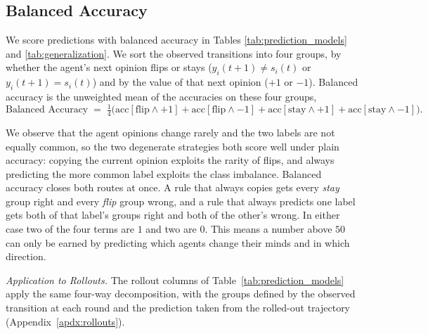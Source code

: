 \subsection{Balanced Accuracy}\label{apdx:metric}

We score predictions with balanced accuracy in Tables \ref{tab:prediction_models} and \ref{tab:generalization}. We sort the observed transitions into four groups, by whether the agent's next opinion flips or stays
($y_i(t{+}1) \neq s_i(t)$ or $y_i(t{+}1) = s_i(t)$) and by the value of that next opinion
($+1$ or $-1$). Balanced accuracy is the unweighted mean of the accuracies on these four groups,
\[
\text{Balanced Accuracy} \;=\; \tfrac{1}{4}\Big(
\mathrm{acc}[\text{flip} \wedge {+}1] +
\mathrm{acc}[\text{flip} \wedge {-}1] +
\mathrm{acc}[\text{stay} \wedge {+}1] +
\mathrm{acc}[\text{stay} \wedge {-}1]
\Big).
\]

We observe that the agent opinions change rarely and the two labels are not equally
common, so the two degenerate strategies both score well under plain accuracy: copying the
current opinion exploits the rarity of flips, and always predicting the more common label
exploits the class imbalance. Balanced accuracy closes both routes at once. A rule that always copies gets
every \textit{stay} group right and every \textit{flip} group wrong, and a rule that always
predicts one label gets both of that label's groups right and both of the other's wrong. In
either case two of the four terms are $1$ and two are $0$. This means a number above $50$ can only be earned by predicting which agents change their minds and in which direction.


\textit{Application to Rollouts.} The rollout columns of Table~\ref{tab:prediction_models}
apply the same four-way decomposition, with the groups defined by the observed transition at
each round and the prediction taken from the rolled-out trajectory
(Appendix~\ref{apdx:rollouts}).
